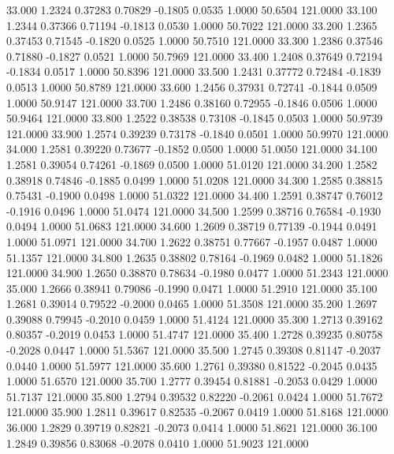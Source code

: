   33.000   1.2324   0.37283   0.70829  -0.1805   0.0535   1.0000  50.6504 121.0000
  33.100   1.2344   0.37366   0.71194  -0.1813   0.0530   1.0000  50.7022 121.0000
  33.200   1.2365   0.37453   0.71545  -0.1820   0.0525   1.0000  50.7510 121.0000
  33.300   1.2386   0.37546   0.71880  -0.1827   0.0521   1.0000  50.7969 121.0000
  33.400   1.2408   0.37649   0.72194  -0.1834   0.0517   1.0000  50.8396 121.0000
  33.500   1.2431   0.37772   0.72484  -0.1839   0.0513   1.0000  50.8789 121.0000
  33.600   1.2456   0.37931   0.72741  -0.1844   0.0509   1.0000  50.9147 121.0000
  33.700   1.2486   0.38160   0.72955  -0.1846   0.0506   1.0000  50.9464 121.0000
  33.800   1.2522   0.38538   0.73108  -0.1845   0.0503   1.0000  50.9739 121.0000
  33.900   1.2574   0.39239   0.73178  -0.1840   0.0501   1.0000  50.9970 121.0000
  34.000   1.2581   0.39220   0.73677  -0.1852   0.0500   1.0000  51.0050 121.0000
  34.100   1.2581   0.39054   0.74261  -0.1869   0.0500   1.0000  51.0120 121.0000
  34.200   1.2582   0.38918   0.74846  -0.1885   0.0499   1.0000  51.0208 121.0000
  34.300   1.2585   0.38815   0.75431  -0.1900   0.0498   1.0000  51.0322 121.0000
  34.400   1.2591   0.38747   0.76012  -0.1916   0.0496   1.0000  51.0474 121.0000
  34.500   1.2599   0.38716   0.76584  -0.1930   0.0494   1.0000  51.0683 121.0000
  34.600   1.2609   0.38719   0.77139  -0.1944   0.0491   1.0000  51.0971 121.0000
  34.700   1.2622   0.38751   0.77667  -0.1957   0.0487   1.0000  51.1357 121.0000
  34.800   1.2635   0.38802   0.78164  -0.1969   0.0482   1.0000  51.1826 121.0000
  34.900   1.2650   0.38870   0.78634  -0.1980   0.0477   1.0000  51.2343 121.0000
  35.000   1.2666   0.38941   0.79086  -0.1990   0.0471   1.0000  51.2910 121.0000
  35.100   1.2681   0.39014   0.79522  -0.2000   0.0465   1.0000  51.3508 121.0000
  35.200   1.2697   0.39088   0.79945  -0.2010   0.0459   1.0000  51.4124 121.0000
  35.300   1.2713   0.39162   0.80357  -0.2019   0.0453   1.0000  51.4747 121.0000
  35.400   1.2728   0.39235   0.80758  -0.2028   0.0447   1.0000  51.5367 121.0000
  35.500   1.2745   0.39308   0.81147  -0.2037   0.0440   1.0000  51.5977 121.0000
  35.600   1.2761   0.39380   0.81522  -0.2045   0.0435   1.0000  51.6570 121.0000
  35.700   1.2777   0.39454   0.81881  -0.2053   0.0429   1.0000  51.7137 121.0000
  35.800   1.2794   0.39532   0.82220  -0.2061   0.0424   1.0000  51.7672 121.0000
  35.900   1.2811   0.39617   0.82535  -0.2067   0.0419   1.0000  51.8168 121.0000
  36.000   1.2829   0.39719   0.82821  -0.2073   0.0414   1.0000  51.8621 121.0000
  36.100   1.2849   0.39856   0.83068  -0.2078   0.0410   1.0000  51.9023 121.0000
